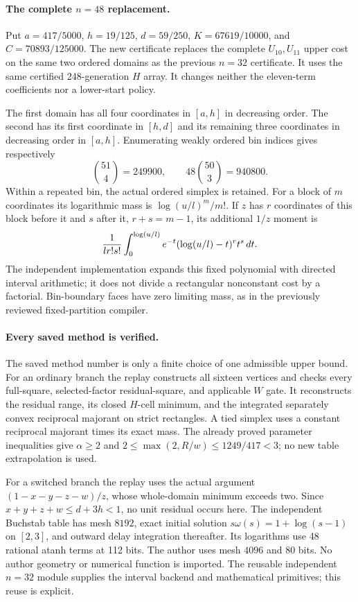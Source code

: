 \paragraph{The complete $n=48$ replacement.}
Put $a=417/5000$, $h=19/125$, $d=59/250$, $K=67619/10000$,
and $C=70893/125000$.  The new certificate replaces the complete
$U_{10},U_{11}$ upper cost on the same two ordered domains as the
previous $n=32$ certificate.  It uses the same certified 248-generation
$H$ array.  It changes neither the eleven-term coefficients nor a
lower-start policy.

The first domain has all four coordinates in $[a,h]$ in decreasing
order.  The second has its first coordinate in $[h,d]$ and its remaining
three coordinates in decreasing order in $[a,h]$.  Enumerating weakly
ordered bin indices gives respectively
\[
 {51\choose4}=249900,\qquad 48{50\choose3}=940800.
\]
Within a repeated bin, the actual ordered simplex is retained.  For a
block of $m$ coordinates its logarithmic mass is
$\log(u/l)^m/m!$.  If $z$ has $r$ coordinates of this block before it
and $s$ after it, $r+s=m-1$, its additional $1/z$ moment is
\[
 {1\over l r!s!}\int_0^{\log(u/l)}
 e^{-t}(\log(u/l)-t)^r t^s\,dt.
\]
The independent implementation expands this fixed polynomial with
directed interval arithmetic; it does not divide a rectangular
nonconstant cost by a factorial.  Bin-boundary faces have zero limiting
mass, as in the previously reviewed fixed-partition compiler.

\paragraph{Every saved method is verified.}
The saved method number is only a finite choice of one admissible
upper bound.  For an ordinary branch the replay constructs all sixteen
vertices and checks every full-square, selected-factor residual-square,
and applicable $W$ gate.  It reconstructs the residual range, its closed
$H$-cell minimum, and the integrated separately convex reciprocal
majorant on strict rectangles.  A tied simplex uses a constant
reciprocal majorant times its exact mass.  The already proved parameter
inequalities give $\alpha\ge2$ and
$2\le \max(2,R/w)\le1249/417<3$; no new table extrapolation is used.

For a switched branch the replay uses the actual argument
$(1-x-y-z-w)/z$, whose whole-domain minimum exceeds two.
Since $x+y+z+w\le d+3h<1$, no unit residual occurs here.
The independent Buchstab table has mesh $8192$, exact initial solution
$s\omega(s)=1+\log(s-1)$ on $[2,3]$, and outward delay integration
thereafter.  Its logarithms use 48 rational atanh terms at 112 bits.
The author uses mesh $4096$ and 80 bits.  No author geometry or numerical
function is imported.  The reusable independent $n=32$ module supplies
the interval backend and mathematical primitives; this reuse is explicit.

